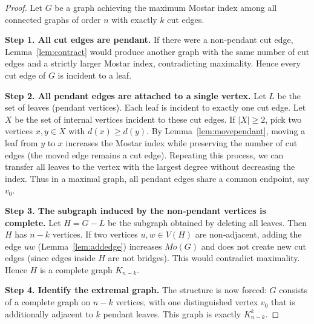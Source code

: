 \documentclass[10pt,a4paper]{amsart}
\begin{document}
\begin{proof}
Let \(G\) be a graph achieving the maximum Mostar index among all connected graphs of order \(n\) with exactly \(k\) cut edges.

\textbf{Step 1. All cut edges are pendant.} If there were a non‑pendant cut edge, Lemma~\ref{lem:contract} would produce another graph with the same number of cut edges and a strictly larger Mostar index, contradicting maximality. Hence every cut edge of \(G\) is incident to a leaf.

\textbf{Step 2. All pendant edges are attached to a single vertex.} Let \(L\) be the set of leaves (pendant vertices). Each leaf is incident to exactly one cut edge. Let \(X\) be the set of internal vertices incident to these cut edges. If \(|X|\ge2\), pick two vertices \(x,y\in X\) with \(d(x)\ge d(y)\). By Lemma~\ref{lem:movependant}, moving a leaf from \(y\) to \(x\) increases the Mostar index while preserving the number of cut edges (the moved edge remains a cut edge). Repeating this process, we can transfer all leaves to the vertex with the largest degree without decreasing the index. Thus in a maximal graph, all pendant edges share a common endpoint, say \(v_0\).

\textbf{Step 3. The subgraph induced by the non‑pendant vertices is complete.} Let \(H = G - L\) be the subgraph obtained by deleting all leaves. Then \(H\) has \(n-k\) vertices. If two vertices \(u,w\in V(H)\) are non‑adjacent, adding the edge \(uw\) (Lemma~\ref{lem:addedge}) increases \(Mo(G)\) and does not create new cut edges (since edges inside \(H\) are not bridges). This would contradict maximality. Hence \(H\) is a complete graph \(K_{n-k}\).

\textbf{Step 4. Identify the extremal graph.} The structure is now forced: \(G\) consists of a complete graph on \(n-k\) vertices, with one distinguished vertex \(v_0\) that is additionally adjacent to \(k\) pendant leaves. This graph is exactly \(K_{n-k}^k\).


\end{proof}
\end{document}

